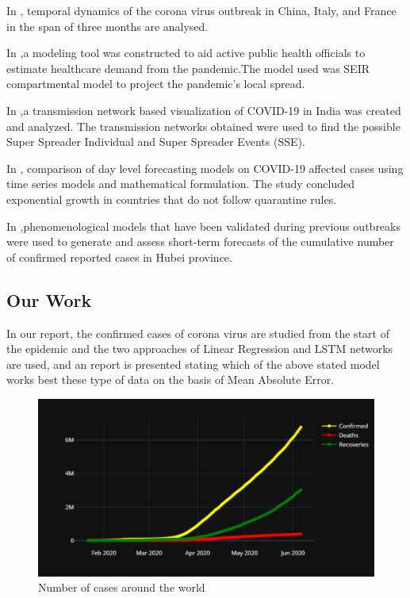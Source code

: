 In \cite{yang2020modified}, temporal dynamics of the corona virus outbreak in China, Italy, and France in
the span of three months are analysed.


In \cite{rainisch2020dynamic},a modeling tool was constructed to aid active public health officials to estimate
healthcare demand from the pandemic.The model used was SEIR compartmental model
to project the pandemic’s local spread.

In \cite{singh2020connecting},a transmission network based visualization  of COVID-19 in India was created and
analyzed. The transmission networks obtained were used to find the possible Super Spreader Individual  and Super Spreader Events
(SSE).

In \cite{elmousalami2020day}, comparison of day level forecasting models on COVID-19 affected
cases using time series models and mathematical formulation. The study
concluded exponential growth in countries that do not follow quarantine rules.

In \cite{roosa2020real},phenomenological models that have been validated during previous outbreaks
were used to generate and assess short-term forecasts of the cumulative number of
confirmed reported cases in Hubei province.

\subsection{Our Work}

In our report, the confirmed cases of corona virus are studied from the start
of the epidemic and the two approaches of Linear Regression and LSTM networks
are used, and an report is presented stating which of the above stated model
works best these type of data on the basis of Mean Absolute Error.

\begin{figure}[h!]
	\centering
	\includegraphics{images/world_wide.png}
	\caption{Number of cases around the world}
	\label{fig:world}
\end{figure}

